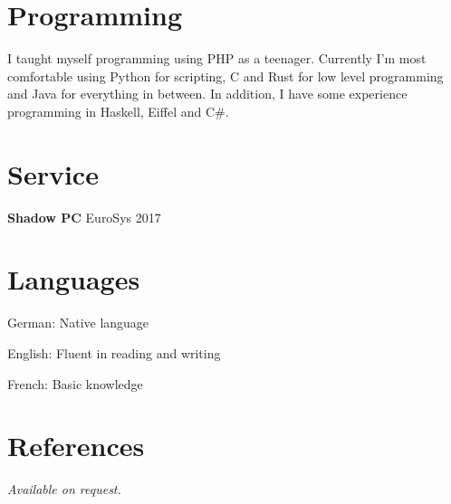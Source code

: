 \documentclass[margin,line]{resume}
\begin{document}
\begin{resume}
    \section{\mysidestyle Programming}

    I taught myself programming using PHP as a teenager. Currently I'm most
    comfortable using Python for scripting, C and Rust for low level programming and
    Java for everything in between. In addition, I have some experience programming
    in Haskell, Eiffel and C\#.

    \section{\mysidestyle Service}
    \textbf{Shadow PC} EuroSys 2017 %

    \section{\mysidestyle Languages}
    \begin{list2}
        \item German: Native language
        \item English: Fluent in reading and writing
        \item French: Basic knowledge
    \end{list2}\vspace{-1.5mm}

    \pagebreak

    \section{\mysidestyle References}
     {\sl Available on request.}


\end{resume}
\end{document}
